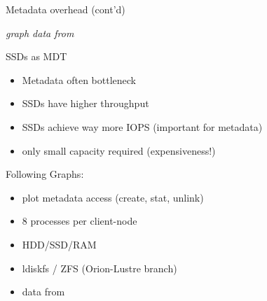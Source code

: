 \begin{frame}{Metadata overhead (cont'd)}
{
    }

    \vspace{1cm}
    \hfill{\scriptsize\emph{graph data from \cite{metadata-scaling}}}
\end{frame}


\begin{frame}{SSDs as MDT}
    \begin{itemize}
        \item Metadata often bottleneck
        \item SSDs have higher throughput
        \item SSDs achieve way more IOPS (important for metadata)
        \item only small capacity required (expensiveness!)
    \end{itemize}

    \pause
    Following Graphs:
    \begin{itemize}
        \item plot metadata access (create, stat, unlink)
        \item 8 processes per client-node
        \item HDD/SSD/RAM
        \item ldiskfs / ZFS (Orion-Lustre branch)
        \item data from \cite{mds-eval}
    \end{itemize}
\end{frame}


